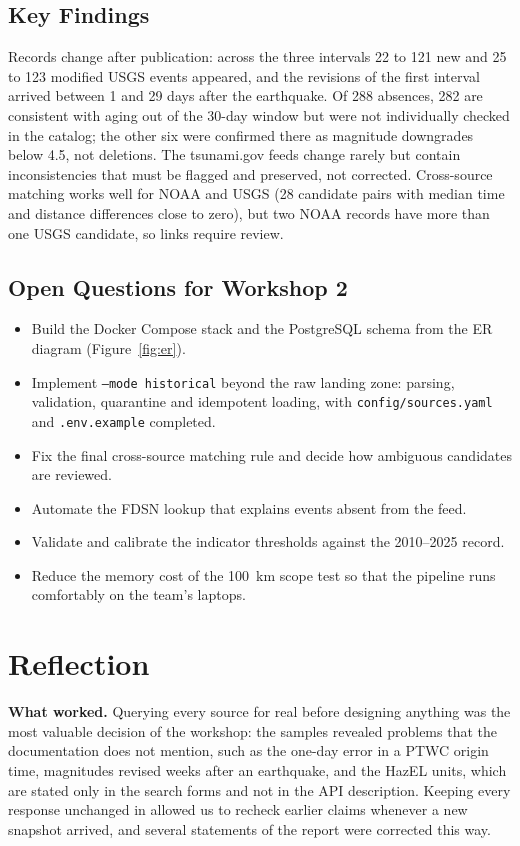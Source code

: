 \documentclass[a4paper,11pt,oneside]{book}
\begin{document}
\section{Key Findings}
Records change after publication: across the three intervals 22 to 121 new and 25 to 123 modified USGS events appeared, and the revisions of the first interval arrived between 1 and 29 days after the earthquake. Of 288 absences, 282 are consistent with aging out of the 30-day window but were not individually checked in the catalog; the other six were confirmed there as magnitude downgrades below 4.5, not deletions.
The tsunami.gov feeds change rarely but contain inconsistencies that must be flagged and preserved, not corrected.
Cross-source matching works well for NOAA and USGS (28 candidate pairs with median time and distance differences close to zero), but two NOAA records have more than one USGS candidate, so links require review.

\section{Open Questions for Workshop 2}
\begin{itemize}[nosep]
  \item Build the Docker Compose stack and the PostgreSQL schema from the ER diagram (Figure~\ref{fig:er}).
  \item Implement \texttt{--mode historical} beyond the raw landing zone: parsing, validation, quarantine and idempotent loading, with \texttt{config/sources.yaml} and \texttt{.env.example} completed.
  \item Fix the final cross-source matching rule and decide how ambiguous candidates are reviewed.
  \item Automate the FDSN lookup that explains events absent from the feed.
  \item Validate and calibrate the indicator thresholds against the 2010--2025 record.
  \item Reduce the memory cost of the 100~km scope test so that the pipeline runs comfortably on the team's laptops.
\end{itemize}

\chapter{Reflection}
\label{ch:reflection}
\textbf{What worked.} Querying every source for real before designing anything was the most valuable decision of the workshop: the samples revealed problems that the documentation does not mention, such as the one-day error in a PTWC origin time, magnitudes revised weeks after an earthquake, and the HazEL units, which are stated only in the search forms and not in the API description.
Keeping every response unchanged in  allowed us to recheck earlier claims whenever a new snapshot arrived, and several statements of the report were corrected this way.
\end{document}
